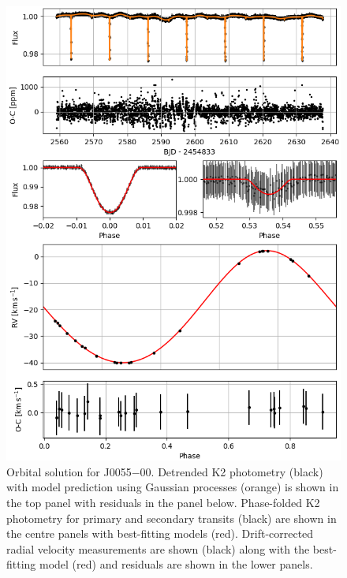\begin{figure}
    \centering
    \includegraphics[scale=0.8]{8-Results/J0055-00/orbital.png}
    \caption{Orbital solution for J0055$-$00. Detrended K2 photometry (black) with model prediction using Gaussian processes (orange) is shown in the top panel with residuals in the panel below. Phase-folded K2 photometry for primary and secondary transits (black) are shown in the centre panels with best-fitting models (red).  Drift-corrected radial velocity measurements are shown (black) along with the best-fitting model (red) and residuals are shown in the lower panels.  }
    \label{fig:J0055-00:orbital}
\end{figure}



